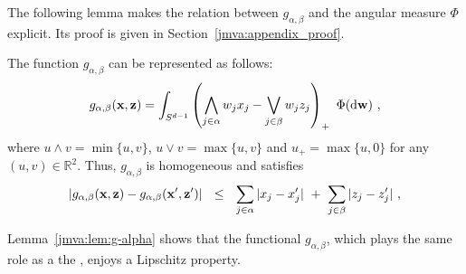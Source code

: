 %
The following lemma makes the relation between  $g_{\alpha,\beta}$ and  the angular measure
$\Phi$ explicit. Its proof is given in Section~\ref{jmva:appendix_proof}.
\begin{lemma}
\label{jmva:lem:g-alpha}
The function $g_{\alpha, \beta}$ can be represented as follows:
\begin{align*}
g_{\alpha, \beta}(\mathbf x, \mathbf z) = \int_{S^{d-1}} \left(\bigwedge_{j \in \alpha}{w_j x_j} - \bigvee_{j \in\beta} w_j z_j\right)_+~ \Phi(\mathrm{d} \mathbf w)~,
\end{align*}
where $u\wedge v=\min\{ u,v \}$, $u\vee v=\max\{ u,v \}$ and $u_+=\max\{u, 0\}$ for any $(u,v)\in \mathbb{R}^2$.
\noindent
Thus, $g_{\alpha, \beta}$ is homogeneous and satisfies
\begin{align*}
|g_{\alpha, \beta}(\mathbf x, \mathbf z) - g_{\alpha, \beta}(\mathbf x', \mathbf z')| ~~\le~~  \sum_{j \in \alpha}|x_j - x_j'| ~+~  \sum_{j \in \beta}|z_j - z_j'|~,
\end{align*}
\end{lemma}
\begin{remark}
Lemma~\ref{jmva:lem:g-alpha} shows that the functional $g_{\alpha, \beta}$, which plays the same role as a  the \stdf, enjoys  a Lipschitz property.
\end{remark}

